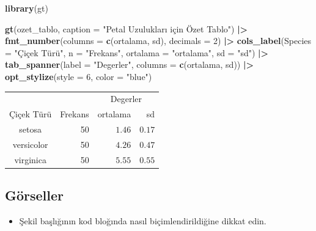 \documentclass[
  oneside]{book}
\newenvironment{Shaded}{\begin{snugshade}}{\end{snugshade}}
\newcommand{\AttributeTok}[1]{\textcolor[rgb]{0.13,0.29,0.53}{#1}}
\newcommand{\DecValTok}[1]{\textcolor[rgb]{0.00,0.00,0.81}{#1}}
\newcommand{\FunctionTok}[1]{\textcolor[rgb]{0.13,0.29,0.53}{\textbf{#1}}}
\newcommand{\NormalTok}[1]{#1}
\newcommand{\SpecialCharTok}[1]{\textcolor[rgb]{0.81,0.36,0.00}{\textbf{#1}}}
\newcommand{\StringTok}[1]{\textcolor[rgb]{0.31,0.60,0.02}{#1}}
\providecommand{\tightlist}{%
  \setlength{\itemsep}{0pt}\setlength{\parskip}{0pt}}
\begin{document}
\begin{Shaded}
\begin{Highlighting}[]
\FunctionTok{library}\NormalTok{(gt)}

\FunctionTok{gt}\NormalTok{(ozet\_tablo, }\AttributeTok{caption =} \StringTok{"Petal Uzulukları için Özet Tablo"}\NormalTok{) }\SpecialCharTok{|\textgreater{}}
  \FunctionTok{fmt\_number}\NormalTok{(}\AttributeTok{columns =} \FunctionTok{c}\NormalTok{(ortalama, sd),}
             \AttributeTok{decimals =} \DecValTok{2}\NormalTok{) }\SpecialCharTok{|\textgreater{}}
  \FunctionTok{cols\_label}\NormalTok{(}\AttributeTok{Species =} \StringTok{"Çiçek Türü"}\NormalTok{,}
             \AttributeTok{n =} \StringTok{"Frekans"}\NormalTok{,}
             \AttributeTok{ortalama =} \StringTok{"ortalama"}\NormalTok{,}
             \AttributeTok{sd =} \StringTok{"sd"}\NormalTok{) }\SpecialCharTok{|\textgreater{}}
  \FunctionTok{tab\_spanner}\NormalTok{(}\AttributeTok{label =} \StringTok{"Degerler"}\NormalTok{,}
              \AttributeTok{columns =} \FunctionTok{c}\NormalTok{(ortalama, sd)) }\SpecialCharTok{|\textgreater{}}
  \FunctionTok{opt\_stylize}\NormalTok{(}\AttributeTok{style =} \DecValTok{6}\NormalTok{, }\AttributeTok{color =} \StringTok{"blue"}\NormalTok{)}
\end{Highlighting}
\end{Shaded}

\begin{longtable}{crrr}
\toprule
 &  & \multicolumn{2}{c}{Degerler} \\ 
\cmidrule(lr){3-4}
Çiçek Türü & Frekans & ortalama & sd \\ 
\midrule\addlinespace[2.5pt]
setosa & 50 & $1.46$ & $0.17$ \\ 
versicolor & 50 & $4.26$ & $0.47$ \\ 
virginica & 50 & $5.55$ & $0.55$ \\ 
\bottomrule
\end{longtable}

\hypertarget{repro-figures}{%
\subsection{Görseller}\label{repro-figures}}

\begin{itemize}
\tightlist
\item
  Şekil başlığının kod bloğında nasıl biçimlendirildiğine dikkat edin.
\end{itemize}
\end{document}
